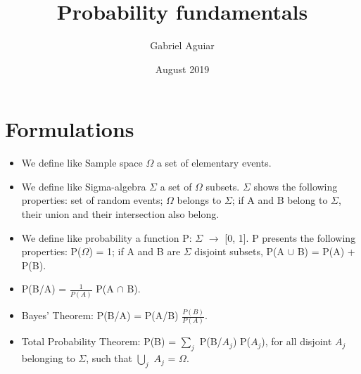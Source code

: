 \documentclass{article}
\title{Probability fundamentals}
\author{Gabriel Aguiar}
\date{August 2019}
\begin{document}
\maketitle

\section{Formulations}

\begin{itemize}
    
\item We define like Sample space $\Omega$ a set of elementary events.
        
\item We define like Sigma-algebra $\Sigma$ a set of $\Omega$ subsets. $\Sigma$ shows the following properties: set of random events; $\Omega$ belongs to $\Sigma$; if A and B belong to $\Sigma$, their union and their intersection also belong.

\item We define like probability a function P: $\Sigma$ $\rightarrow$ [0, 1]. P presents the following properties: P($\Omega$) = 1; if A and B are $\Sigma$ disjoint subsets, P(A $\cup$ B) = P(A) + P(B).

\item P(B/A) = $\frac{1}{P(A)}$ P(A $\cap$ B).

\item Bayes' Theorem: P(B/A) = P(A/B) $\frac{P(B)}{P(A)}$.

\item Total Probability Theorem: P(B) = $\sum\limits_{j}$ P(B/$A_{j}$) P($A_{j}$), for all disjoint $A_{j}$ belonging to $\Sigma$, such that $\bigcup\limits_{j}$ $A_{j}$ = $\Omega$.



        
\end{itemize}
\end{document}
